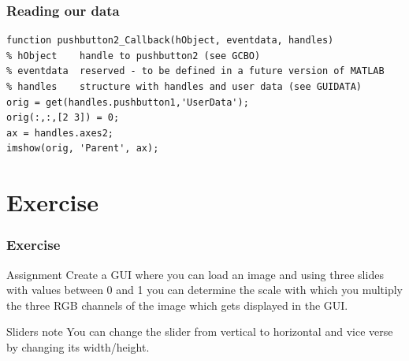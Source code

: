 \documentclass{beamer}
\begin{document}
\begin{frame}[fragile]
  \frametitle{Reading our data}
  \begin{verbatim}
function pushbutton2_Callback(hObject, eventdata, handles)
% hObject    handle to pushbutton2 (see GCBO)
% eventdata  reserved - to be defined in a future version of MATLAB
% handles    structure with handles and user data (see GUIDATA)
orig = get(handles.pushbutton1,'UserData');
orig(:,:,[2 3]) = 0;
ax = handles.axes2;
imshow(orig, 'Parent', ax); \end{verbatim}
\end{frame}

\section{Exercise}

\begin{frame}
  \frametitle{Exercise}
  \begin{block}{Assignment}
  Create a GUI where you can load an image and using three slides with values between 0 and 1 you can determine the scale with which you multiply the three RGB channels of the image which gets displayed in the GUI.

  \end{block}
  
  \begin{block}{Sliders note}
    You can change the slider from vertical to horizontal and vice verse by changing its width/height.
  \end{block}
  
\end{frame}

 
\end{document}
